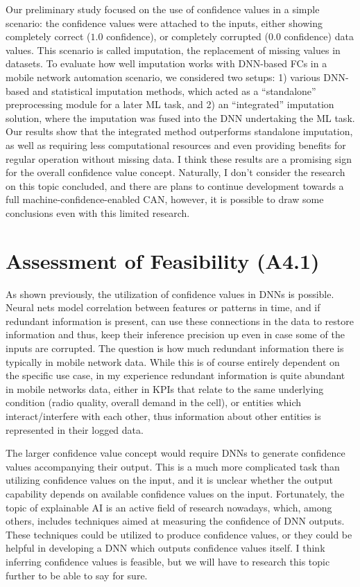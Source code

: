 	Our preliminary study focused on the use of confidence values in a simple scenario: the confidence values were attached to the inputs, either showing completely correct ($1.0$ confidence), or completely corrupted ($0.0$ confidence) data values.
	This scenario is called imputation, the replacement of missing values in datasets.
	To evaluate how well imputation works with \ac{DNN}-based \acp{FC} in a mobile network automation scenario, we considered two setups: 1) various \ac{DNN}-based and statistical imputation methods, which acted as a ``standalone'' preprocessing module for a later \ac{ML} task, and 2) an ``integrated'' imputation solution, where the imputation was fused into the \ac{DNN} undertaking the \ac{ML} task.
	Our results show that the integrated method outperforms standalone imputation, as well as requiring less computational resources and even  providing benefits for regular operation without missing data.
	I think these results are a promising sign for the overall confidence value concept.
	Naturally, I don't consider the research on this topic concluded, and there are plans to continue development towards a full machine-confidence-enabled \ac{CAN}, however, it is possible to draw some conclusions even with this limited research.
	
	\section{Assessment of Feasibility (A4.1)}
	
		As shown previously, the utilization of confidence values in \acp{DNN} is possible.
		Neural nets model correlation between features or patterns in time, and if redundant information is present, can use these connections in the data to restore information and thus, keep their inference precision up even in case some of the inputs are corrupted.
		The question is how much redundant information there is typically in mobile network data.
		While this is of course entirely dependent on the specific use case, in my experience redundant information is quite abundant in mobile networks data, either in \acp{KPI} that relate to the same underlying condition (radio quality, overall demand in the cell), or entities which interact/interfere with each other, thus information about other entities is represented in their logged data.
		
		The larger confidence value concept would require \acp{DNN} to generate confidence values accompanying their output.
		This is a much more complicated task than utilizing confidence values on the input, and it is unclear whether the output capability depends on available confidence values on the input.
		Fortunately, the topic of explainable \ac{AI} is an active field of research nowadays, which, among others, includes techniques aimed at measuring the confidence of \ac{DNN} outputs.
		These techniques could be utilized to produce confidence values, or they could be helpful in developing a \ac{DNN} which outputs confidence values itself.
		I think inferring confidence values is feasible, but we will have to research this topic further to be able to say for sure. 
		
